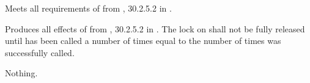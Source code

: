 \begin{itemdecl}
\end{itemdecl}
\begin{itemdescr}
	\pnum
	\requires
	Meets all requirements of  from , 
	30.2.5.2 in \CppXIV.
	
	\pnum
	\effects
	Produces all effects of  from , 
	30.2.5.2 in \CppXIV. The lock on  shall not be fully released 
	until  has been called a number of times equal to the 
	number of times  was successfully called.
	
	\pnum
	\throws
	Nothing.
\end{itemdescr}
